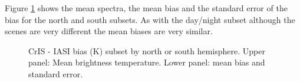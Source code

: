 \documentclass[twocolumn,10pt]{article}
\begin{document}
Figure \ref{fig:X7} shows the mean spectra, the mean bias and the standard error of the bias for the north and south subsets.
As with the day/night subset although the scenes are very different the mean biases are
very similar.

\begin{figure}[htb]
  \centering
\hfill
  \caption{CrIS - IASI bias (K) subset by north or south hemisphere. Upper panel: Mean brightness temperature. Lower panel: mean bias and standard error.}
  \label{fig:X7}
\end{figure}
\end{document}
